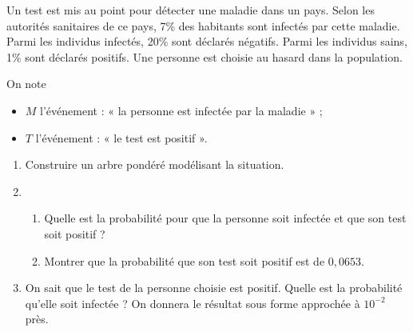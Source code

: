 \documentclass[11pt,fleqn, openany]{book} %
\begin{document}
\begin{exercise}[topic=prob01, subtitle={(Polynésie 2021)}]

Un test est mis au point pour détecter une maladie dans un pays.
Selon les autorités sanitaires de ce pays, 7\% des habitants sont infectés par cette maladie. Parmi les individus infectés, 20\% sont déclarés négatifs.
Parmi les individus sains, 1\% sont déclarés positifs.
Une personne est choisie au hasard dans la population.

On note
\begin{itemize}
\item $M$ l'événement : « la personne est infectée par la maladie » ;
\item $T$ l'événement : « le test est positif ».
\end{itemize}

\begin{enumerate}
\item Construire un arbre pondéré modélisant la situation.
\item \begin{enumerate}
\item Quelle est la probabilité pour que la personne soit infectée et que son test soit positif ?
\item Montrer que la probabilité que son test soit positif est de $0,0653$.
\end{enumerate}
\item On sait que le test de la personne choisie est positif. Quelle est la probabilité qu'elle soit infectée ?
On donnera le résultat sous forme approchée à $10^{-2}$ près.
\end{enumerate}

\end{exercise}
\end{document}
